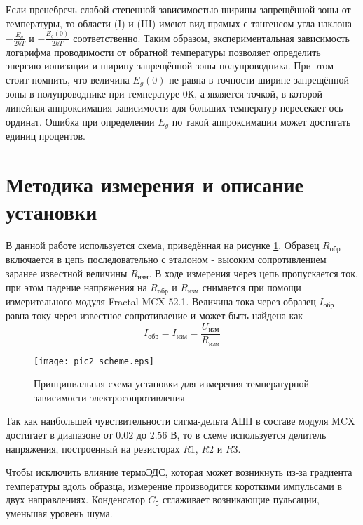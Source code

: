 Если пренебречь слабой степенной зависимостью ширины запрещённой зоны от температуры, то области (I) и (III) имеют вид прямых с тангенсом угла наклона $-\frac{E_{d}}{2 k T}$ и $-\frac{E_{g}(0)}{2 k T}$ соответственно. Таким образом, экспериментальная зависимость логарифма проводимости от обратной температуры позволяет определить энергию ионизации и ширину запрещённой зоны полупроводника. При этом стоит помнить, что величина $E_{g}(0)$ не равна в точности ширине запрещённой зоны в полупроводнике при температуре 0\textdegree К, а является точкой, в которой линейная аппроксимация зависимости для больших температур пересекает ось ординат. Ошибка при определении $E_{g}$ по такой аппроксимации может достигать единиц процентов.

\section{Методика измерения и описание установки}

В данной работе используется схема, приведённая на рисунке \ref{pic2_scheme}. Образец $R_{\text{обр}}$ включается в цепь последовательно с эталоном - высоким сопротивлением заранее известной величины $R_{\text{изм}}$. В ходе измерения через цепь пропускается ток, при этом падение напряжения на $R_{\text{обр}}$ и $R_{\text{изм}}$ снимается при помощи измерительного модуля Fractal MCX 52.1. Величина тока через образец $I_{\text{обр}}$ равна току через известное сопротивление и может быть найдена как
\begin{equation}
I_{\text{обр}} = I_{\text{изм}} = \frac{U_{\text{изм}}}{R_{\text{изм}}}
\end{equation}

\begin{figure}[h!]\centering
\texttt{[image: pic2\_scheme.eps]}
\caption{Принципиальная схема установки для измерения температурной зависимости электросопротивления}
\label{pic2_scheme}
\end{figure}

Так как наибольшей чувствительности сигма-дельта АЦП в составе модуля MCX достигает в диапазоне от $0.02$ до $2.56$ В, то в схеме используется делитель напряжения, построенный на резисторах $R1$, $R2$ и $R3$.

Чтобы исключить влияние термоЭДС, которая может возникнуть из-за градиента температуры вдоль образца, измерение производится короткими импульсами в двух направлениях. Конденсатор $C_{\text{б}}$ сглаживает возникающие пульсации, уменьшая уровень шума.

